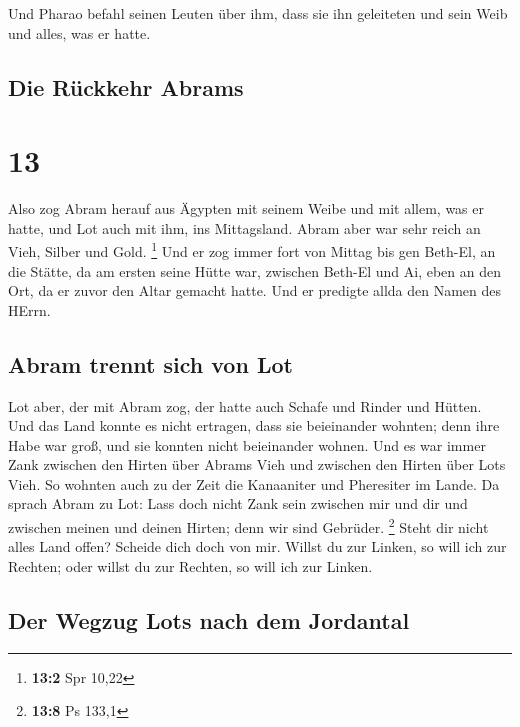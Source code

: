  Und Pharao befahl seinen Leuten über ihm, dass sie ihn
geleiteten und sein Weib und alles, was er hatte.

\hypertarget{die-ruxfcckkehr-abrams}{%
\subsection{Die Rückkehr Abrams}\label{die-ruxfcckkehr-abrams}}

\hypertarget{section-12}{%
\section{13}\label{section-12}}

 Also zog Abram herauf aus Ägypten mit seinem Weibe und
mit allem, was er hatte, und Lot auch mit ihm, ins Mittagsland.
 Abram aber war sehr reich an Vieh, Silber und Gold.
\footnote{\textbf{13:2} Spr 10,22}  Und er zog immer fort
von Mittag bis gen Beth-El, an die Stätte, da am ersten seine Hütte war,
zwischen Beth-El und Ai,  eben an den Ort, da er zuvor den
Altar gemacht hatte. Und er predigte allda den Namen des HErrn.

\hypertarget{abram-trennt-sich-von-lot}{%
\subsection{Abram trennt sich von Lot}\label{abram-trennt-sich-von-lot}}

 Lot aber, der mit Abram zog, der hatte auch Schafe und
Rinder und Hütten.  Und das Land konnte es nicht ertragen,
dass sie beieinander wohnten; denn ihre Habe war groß, und sie konnten
nicht beieinander wohnen.  Und es war immer Zank zwischen
den Hirten über Abrams Vieh und zwischen den Hirten über Lots Vieh. So
wohnten auch zu der Zeit die Kanaaniter und Pheresiter im Lande.
 Da sprach Abram zu Lot: Lass doch nicht Zank sein
zwischen mir und dir und zwischen meinen und deinen Hirten; denn wir
sind Gebrüder. \footnote{\textbf{13:8} Ps 133,1}  Steht
dir nicht alles Land offen? Scheide dich doch von mir. Willst du zur
Linken, so will ich zur Rechten; oder willst du zur Rechten, so will ich
zur Linken.

\hypertarget{der-wegzug-lots-nach-dem-jordantal}{%
\subsection{Der Wegzug Lots nach dem
Jordantal}\label{der-wegzug-lots-nach-dem-jordantal}}

